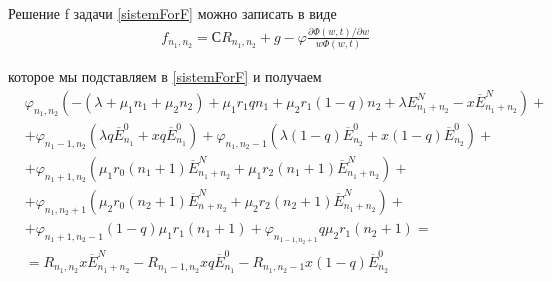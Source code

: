 Решение f задачи \eqref{sistemForF} можно записать в виде \\
 \begin{equation}\label{solutionForF}
	\begin{split}
		&f_{n_{1}, n_{2}}=СR_{n_{1}, n_{2}}+g-\varphi\frac{\partial \Phi(w,t)/ \partial w}{w\Phi(w,t)}
	\end{split}
\end{equation}

которое мы подставляем в \eqref{sistemForF} и получаем
 \begin{equation*}
	\begin{split}
		&\varphi_{n_{1}, n_{2}}(-(\lambda +\mu_{1} n_{1}+\mu_{2} n_{2})+\mu_{1} r_{1} q n_{1}+ \mu_{2} r_{1} (1-q) n_{2} + \lambda E_{n_{1} + n_{2}}^{N} - x\overline{E}_{n_{1} + n_{2}}^{N})+\\
		&+\varphi_{n_{1}-1, n_{2}}(\lambda q \overline{E}_{n_{1}}^{0}+xq\overline{E}_{n_{1}}^{0})+\varphi_{n_{1}, n_{2}-1}(\lambda (1-q) \overline{E}_{n_{2}}^{0}+x(1-q)\overline{E}_{n_{2}}^{0})+\\
		&+\varphi_{n_{1}+1, n_{2}}(\mu_{1} r_{0}(n_{1}+1)\overline{E}_{n_{1} + n_{2}}^{N} + \mu_{1} r_{2}(n_{1}+1)\overline{E}_{n_{1} + n_{2}}^{N})+\\
		&+\varphi_{n_{1}, n_{2}+1}(\mu_{2} r_{0}(n_{2}+1)\overline{E}_{n_{} + n_{2}}^{N} + \mu_{2} r_{2}(n_{2}+1)\overline{E}_{n_{1} + n_{2}}^{N})+\\
		&+\varphi_{n_{1}+1, n_{2}-1}(1-q)\mu_{1} r_{1} (n_{1}+1)+\varphi_{n_{1-1, n_{2}+1}}q\mu_{2}r_{1}(n_{2}+1)=\\
		&=R_{n_{1}, n_{2}} x\overline{E}_{n_{1} + n_{2}}^{N}-R_{n_{1}-1, n_{2}}xq\overline{E}_{n_{1}}^{0}-R_{n_{1}, n_{2}-1}x(1-q)\overline{E}_{n_{2}}^{0}
	\end{split}
\end{equation*}
